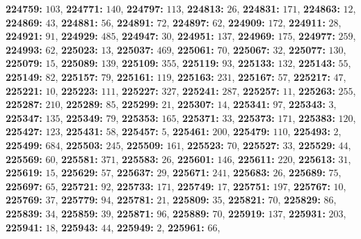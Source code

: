 \textsf{\bfseries 224759:} $103$, \textsf{\bfseries 224771:} $140$, \textsf{\bfseries 224797:} $113$, \textsf{\bfseries 224813:} $26$, \textsf{\bfseries 224831:} $171$, \textsf{\bfseries 224863:} $12$, \textsf{\bfseries 224869:} $43$, \textsf{\bfseries 224881:} $56$, \textsf{\bfseries 224891:} $72$, \textsf{\bfseries 224897:} $62$, \textsf{\bfseries 224909:} $172$, \textsf{\bfseries 224911:} $28$, \textsf{\bfseries 224921:} $91$, \textsf{\bfseries 224929:} $485$, \textsf{\bfseries 224947:} $30$, \textsf{\bfseries 224951:} $137$, \textsf{\bfseries 224969:} $175$, \textsf{\bfseries 224977:} $259$, \textsf{\bfseries 224993:} $62$, \textsf{\bfseries 225023:} $13$, \textsf{\bfseries 225037:} $469$, \textsf{\bfseries 225061:} $70$, \textsf{\bfseries 225067:} $32$, \textsf{\bfseries 225077:} $130$, \textsf{\bfseries 225079:} $15$, \textsf{\bfseries 225089:} $139$, \textsf{\bfseries 225109:} $355$, \textsf{\bfseries 225119:} $93$, \textsf{\bfseries 225133:} $132$, \textsf{\bfseries 225143:} $55$, \textsf{\bfseries 225149:} $82$, \textsf{\bfseries 225157:} $79$, \textsf{\bfseries 225161:} $119$, \textsf{\bfseries 225163:} $231$, \textsf{\bfseries 225167:} $57$, \textsf{\bfseries 225217:} $47$, \textsf{\bfseries 225221:} $10$, \textsf{\bfseries 225223:} $111$, \textsf{\bfseries 225227:} $327$, \textsf{\bfseries 225241:} $287$, \textsf{\bfseries 225257:} $11$, \textsf{\bfseries 225263:} $255$, \textsf{\bfseries 225287:} $210$, \textsf{\bfseries 225289:} $85$, \textsf{\bfseries 225299:} $21$, \textsf{\bfseries 225307:} $14$, \textsf{\bfseries 225341:} $97$, \textsf{\bfseries 225343:} $3$, \textsf{\bfseries 225347:} $135$, \textsf{\bfseries 225349:} $79$, \textsf{\bfseries 225353:} $165$, \textsf{\bfseries 225371:} $33$, \textsf{\bfseries 225373:} $171$, \textsf{\bfseries 225383:} $120$, \textsf{\bfseries 225427:} $123$, \textsf{\bfseries 225431:} $58$, \textsf{\bfseries 225457:} $5$, \textsf{\bfseries 225461:} $200$, \textsf{\bfseries 225479:} $110$, \textsf{\bfseries 225493:} $2$, \textsf{\bfseries 225499:} $684$, \textsf{\bfseries 225503:} $245$, \textsf{\bfseries 225509:} $161$, \textsf{\bfseries 225523:} $70$, \textsf{\bfseries 225527:} $33$, \textsf{\bfseries 225529:} $44$, \textsf{\bfseries 225569:} $60$, \textsf{\bfseries 225581:} $371$, \textsf{\bfseries 225583:} $26$, \textsf{\bfseries 225601:} $146$, \textsf{\bfseries 225611:} $220$, \textsf{\bfseries 225613:} $31$, \textsf{\bfseries 225619:} $15$, \textsf{\bfseries 225629:} $57$, \textsf{\bfseries 225637:} $29$, \textsf{\bfseries 225671:} $241$, \textsf{\bfseries 225683:} $26$, \textsf{\bfseries 225689:} $75$, \textsf{\bfseries 225697:} $65$, \textsf{\bfseries 225721:} $92$, \textsf{\bfseries 225733:} $171$, \textsf{\bfseries 225749:} $17$, \textsf{\bfseries 225751:} $197$, \textsf{\bfseries 225767:} $10$, \textsf{\bfseries 225769:} $37$, \textsf{\bfseries 225779:} $94$, \textsf{\bfseries 225781:} $21$, \textsf{\bfseries 225809:} $35$, \textsf{\bfseries 225821:} $70$, \textsf{\bfseries 225829:} $86$, \textsf{\bfseries 225839:} $34$, \textsf{\bfseries 225859:} $39$, \textsf{\bfseries 225871:} $96$, \textsf{\bfseries 225889:} $70$, \textsf{\bfseries 225919:} $137$, \textsf{\bfseries 225931:} $203$, \textsf{\bfseries 225941:} $18$, \textsf{\bfseries 225943:} $44$, \textsf{\bfseries 225949:} $2$, \textsf{\bfseries 225961:} $66$, 
